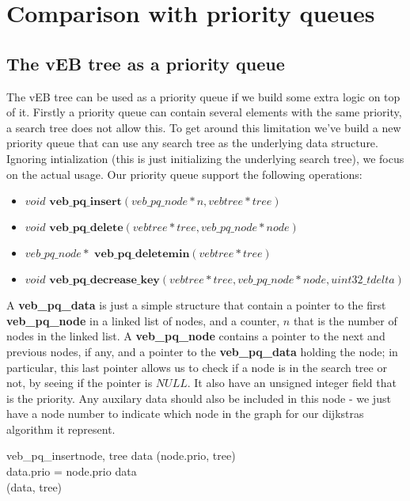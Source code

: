 \section*{Comparison with priority queues}
\subsection*{The vEB tree as a priority queue}
The vEB tree can be used as a priority queue if we build some extra logic on top of it. Firstly a priority queue can contain several elements with the same priority, a search tree does not allow this. To get around this limitation we've build a new priority queue that can use any search tree as the underlying data structure. Ignoring intialization (this is just initializing the underlying search tree), we focus on the actual usage. Our priority queue support the following operations:

\begin{itemize}
  \item $void \textbf{ veb\_pq\_insert}(veb\_pq\_node * n, vebtree * tree)$
  \item $void \textbf{ veb\_pq\_delete}(vebtree * tree, veb\_pq\_node * node)$
  \item $veb\_pq\_node * \textbf{ veb\_pq\_deletemin}(vebtree * tree)$
  \item $void \textbf{ veb\_pq\_decrease\_key}(vebtree * tree, veb\_pq\_node * node, uint32\_t delta)$
\end{itemize}
A \textbf{veb\_pq\_data} is just a simple structure that contain a pointer to the first \textbf{veb\_pq\_node} in a linked list of nodes, and a counter, $n$ that is the number of nodes in the linked list. A \textbf{veb\_pq\_node} contains a pointer to the next and previous nodes, if any, and a pointer to the \textbf{veb\_pq\_data} holding the node; in particular, this last pointer allows us to check if a node is in the search tree or not, by seeing if the pointer is $NULL$. It also have an unsigned integer field that is the priority. Any auxilary data should also be included in this node - we just have a node number to indicate which node in the graph for our dijkstras algorithm it represent.

\begin{pseudocode}[Ovalbox]{veb\_pq\_insert}{node, tree}
data \GETS {}(node.prio, tree)\\
\IF data.prio = node.prio
\THEN {}
\ELSE 
\BEGIN
data \GETS {} \\
  (data, tree)
\END
\end{pseudocode}

